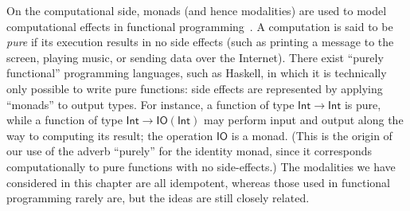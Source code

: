 \documentclass[12pt]{article}
\begin{document}
On the computational side, monads (and hence modalities) are used to model computational effects in functional programming~\cite{Moggi89}.%
%
%
A computation is said to be \emph{pure} if its execution results in no side effects (such as printing a message to the screen, playing music, or sending data over the Internet).
There exist ``purely functional'' programming languages, such as Haskell, in which it is technically only possible to write pure functions: side effects are represented by applying ``monads'' to output types.
For instance, a function of type $\mathsf{Int}\to\mathsf{Int}$ is pure, while a function of type $\mathsf{Int}\to \mathsf{IO}(\mathsf{Int})$ may perform input and output along the way to computing its result; the operation $\mathsf{IO}$ is a monad.
%
(This is the origin of our use of the adverb ``purely'' for the identity monad, since it corresponds computationally to pure functions with no side-effects.)
The modalities we have considered in this chapter are all idempotent, whereas those used in functional programming rarely are, but the ideas are still closely related.
\end{document}
